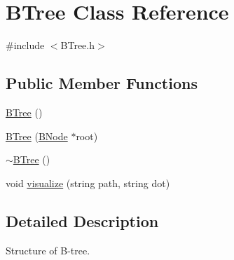 \hypertarget{class_b_tree}{\section{B\+Tree Class Reference}
\label{class_b_tree}
}


{\ttfamily \#include $<$B\+Tree.\+h$>$}

\subsection*{Public Member Functions}
\begin{DoxyCompactItemize}
\item 
\hyperlink{class_b_tree_ae3adf097939b1bce7fba5a5d55ff8907}{B\+Tree} ()
\item 
\hyperlink{class_b_tree_a47afd88071e3191ed5f33b104284e019}{B\+Tree} (\hyperlink{class_b_node}{B\+Node} $\ast$root)
\item 
\hyperlink{class_b_tree_a1d0dbad21ec825a7c8e5625709010e6c}{$\sim$\+B\+Tree} ()
\item 
void \hyperlink{class_b_tree_af290e107b1a60c7c4fea4c3495ed259c}{visualize} (string path, string dot)
\end{DoxyCompactItemize}


\subsection{Detailed Description}
Structure of B-\/tree. 

